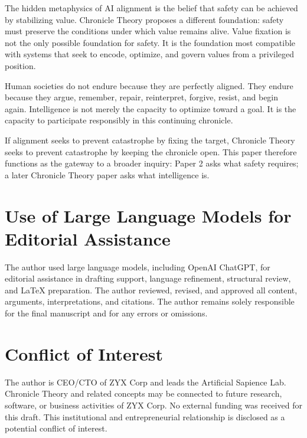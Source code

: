 \documentclass[11pt,a4paper]{article}
\begin{document}
The hidden metaphysics of AI alignment is the belief that safety can be achieved by stabilizing value. Chronicle Theory proposes a different foundation: safety must preserve the conditions under which value remains alive. Value fixation is not the only possible foundation for safety. It is the foundation most compatible with systems that seek to encode, optimize, and govern values from a privileged position.

Human societies do not endure because they are perfectly aligned. They endure because they argue, remember, repair, reinterpret, forgive, resist, and begin again. Intelligence is not merely the capacity to optimize toward a goal. It is the capacity to participate responsibly in this continuing chronicle.

If alignment seeks to prevent catastrophe by fixing the target, Chronicle Theory seeks to prevent catastrophe by keeping the chronicle open. This paper therefore functions as the gateway to a broader inquiry: Paper 2 asks what safety requires; a later Chronicle Theory paper asks what intelligence is.

\section*{Use of Large Language Models for Editorial Assistance}

The author used large language models, including OpenAI ChatGPT, for editorial assistance in drafting support, language refinement, structural review, and LaTeX preparation. The author reviewed, revised, and approved all content, arguments, interpretations, and citations. The author remains solely responsible for the final manuscript and for any errors or omissions.

\section*{Conflict of Interest}

The author is CEO/CTO of ZYX Corp and leads the Artificial Sapience Lab. Chronicle Theory and related concepts may be connected to future research, software, or business activities of ZYX Corp. No external funding was received for this draft. This institutional and entrepreneurial relationship is disclosed as a potential conflict of interest.

\printbibliography
\end{document}
